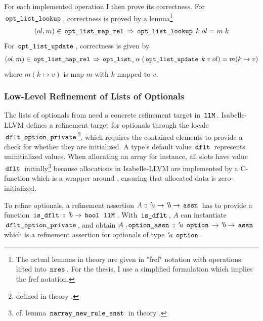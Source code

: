 For each implemented operation I then prove its correctness.
For $\,\text{\ttfamily opt\_list\_lookup}\,$, correctness is proved by a lemma\footnote{The actual lemmas in theory  are given in "fref" notation with operations lifted into $\,\text{\ttfamily nres}\,$. For the thesis, I use a simplified formulation which implies the fref notation.}
\begin{gather*}
	(ol,m) \in \,\text{\ttfamily opt\_list\_map\_rel}\, \Rightarrow
	\,\text{\ttfamily opt\_list\_lookup}\, \; k \; ol = m \; k
\end{gather*}
For $\,\text{\ttfamily opt\_list\_update}\,$, correctness is given by
\begin{gather*}
	(ol,m) \in \,\text{\ttfamily opt\_list\_map\_rel}\, \Rightarrow
	\,\text{\ttfamily opt\_list\_}\,\alpha \; (\,\text{\ttfamily opt\_list\_update}\, \; k \; v \; ol) = m(k\mapsto v)
\end{gather*}
where $m(k \mapsto v)$ is map $m$ with $k$ mapped to $v$.

\subsubsection{Low-Level Refinement of Lists of Optionals}\label{sec:low-level-refinement-of-lists-of-optionals}

The lists of optionals from  need a concrete refinement target in $\,\text{\ttfamily llM}\,$.
Isabelle-LLVM defines a refinement target for optionals through the locale $\,\text{\ttfamily dflt\_option\_private}\,$\footnote{defined in theory .}, which requires the contained elements to provide a check for whether they are initialized.
A type's default value $\,\text{\ttfamily dflt}\,$ represents uninitialized values.
When allocating an array for instance, all slots have value $\,\text{\ttfamily dflt}\,$ initially\footnote{cf. lemma $\,\text{\ttfamily narray\_new\_rule\_snat}\,$ in theory .} because allocations in Isabelle-LLVM are implemented by a C-function  which is a wrapper around , ensuring that allocated data is zero-initialized.

To refine optionals, a refinement assertion $A \mathrel{\mathord{:}\mkern-1.2mu\mathord{:}} {\mskip2mu '\mskip-2mua} \rightarrow {\mskip2mu '\mskip-2mub} \rightarrow \,\text{\ttfamily assn}\,$ has to provide a function $\,\text{\ttfamily is\_dflt}\, \mathrel{\mathord{:}\mkern-1.2mu\mathord{:}} {\mskip2mu '\mskip-2mub} \rightarrow \,\text{\ttfamily bool}\, \; \,\text{\ttfamily llM}\,$.
With $\,\text{\ttfamily is\_dflt}\,$, $A$ can instantiate $\,\text{\ttfamily dflt\_option\_private}\,$, and obtain $A\,\text{\ttfamily .option\_assn}\, \mathrel{\mathord{:}\mkern-1.2mu\mathord{:}} {\mskip2mu '\mskip-2mua} \; \,\text{\ttfamily option}\, \rightarrow {\mskip2mu '\mskip-2mub} \rightarrow \,\text{\ttfamily assn}\,$ which is a refinement assertion for optionals of type ${\mskip2mu '\mskip-2mua} \; \,\text{\ttfamily option}\,$.

